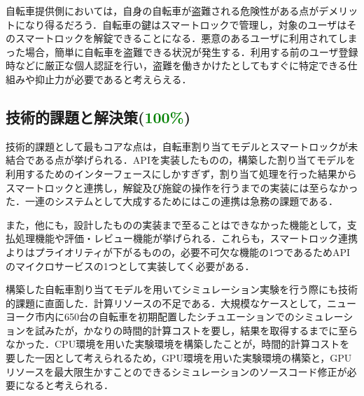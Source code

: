       \par 自転車提供側においては，自身の自転車が盗難される危険性がある点がデメリットになり得るだろう．自転車の鍵はスマートロックで管理し，対象のユーザはそのスマートロックを解錠できることになる．悪意のあるユーザに利用されてしまった場合，簡単に自転車を盗難できる状況が発生する．利用する前のユーザ登録時などに厳正な個人認証を行い，盗難を働きかけたとしてもすぐに特定できる仕組みや抑止力が必要であると考えらえる．
      
  \subsection{技術的課題と解決策(\textcolor{green}{100\%})}
    \label{sec:技術的課題と解決策}
      \par 技術的課題として最もコアな点は，自転車割り当てモデルとスマートロックが未結合である点が挙げられる．APIを実装したものの，構築した割り当てモデルを利用するためのインターフェースにしかすぎず，割り当て処理を行った結果からスマートロックと連携し，解錠及び施錠の操作を行うまでの実装には至らなかった．一連のシステムとして大成するためにはこの連携は急務の課題である．
      \par また，他にも，設計したものの実装まで至ることはできなかった機能として，支払処理機能や評価・レビュー機能が挙げられる．これらも，スマートロック連携よりはプライオリティが下がるものの，必要不可欠な機能の1つであるためAPIのマイクロサービスの1つとして実装してく必要がある．
      \par 構築した自転車割り当てモデルを用いてシミュレーション実験を行う際にも技術的課題に直面した．計算リソースの不足である．大規模なケースとして，ニューヨーク市内に650台の自転車を初期配置したシチュエーションでのシミュレーションを試みたが，かなりの時間的計算コストを要し，結果を取得するまでに至らなかった．CPU環境を用いた実験環境を構築したことが，時間的計算コストを要した一因として考えられるため，GPU環境を用いた実験環境の構築と，GPUリソースを最大限生かすことのできるシミュレーションのソースコード修正が必要になると考えられる．
      
